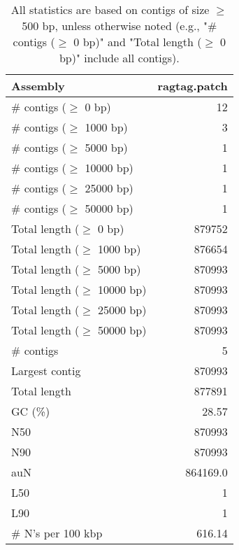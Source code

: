 \documentclass[12pt,a4paper]{article}
\begin{document}
\begin{table}[ht]
\begin{center}
\caption{All statistics are based on contigs of size $\geq$ 500 bp, unless otherwise noted (e.g., "\# contigs ($\geq$ 0 bp)" and "Total length ($\geq$ 0 bp)" include all contigs).}
\begin{tabular}{|l*{1}{|r}|}
\hline
Assembly & ragtag.patch \\ \hline
\# contigs ($\geq$ 0 bp) & 12 \\ \hline
\# contigs ($\geq$ 1000 bp) & 3 \\ \hline
\# contigs ($\geq$ 5000 bp) & 1 \\ \hline
\# contigs ($\geq$ 10000 bp) & 1 \\ \hline
\# contigs ($\geq$ 25000 bp) & 1 \\ \hline
\# contigs ($\geq$ 50000 bp) & 1 \\ \hline
Total length ($\geq$ 0 bp) & 879752 \\ \hline
Total length ($\geq$ 1000 bp) & 876654 \\ \hline
Total length ($\geq$ 5000 bp) & 870993 \\ \hline
Total length ($\geq$ 10000 bp) & 870993 \\ \hline
Total length ($\geq$ 25000 bp) & 870993 \\ \hline
Total length ($\geq$ 50000 bp) & 870993 \\ \hline
\# contigs & 5 \\ \hline
Largest contig & 870993 \\ \hline
Total length & 877891 \\ \hline
GC (\%) & 28.57 \\ \hline
N50 & 870993 \\ \hline
N90 & 870993 \\ \hline
auN & 864169.0 \\ \hline
L50 & 1 \\ \hline
L90 & 1 \\ \hline
\# N's per 100 kbp & 616.14 \\ \hline
\end{tabular}
\end{center}
\end{table}
\end{document}

